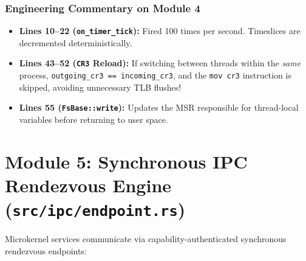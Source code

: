 \subsubsection*{Engineering Commentary on Module 4}
\begin{itemize}
    \item \textbf{Lines 10--22 (\texttt{on\_timer\_tick}):} Fired 100 times per second. Timeslices are decremented deterministically.
    \item \textbf{Lines 43--52 (\texttt{CR3} Reload):} If switching between threads within the \textit{same} process, \texttt{outgoing\_cr3 == incoming\_cr3}, and the \texttt{mov cr3} instruction is skipped, avoiding unnecessary TLB flushes!
    \item \textbf{Lines 55 (\texttt{FsBase::write}):} Updates the MSR responsible for thread-local variables before returning to user space.
\end{itemize}

\section{Module 5: Synchronous IPC Rendezvous Engine (\texttt{src/ipc/endpoint.rs})}
\label{sec:tour_ipc_annotated}

Microkernel services communicate via capability-authenticated synchronous rendezvous endpoints:

